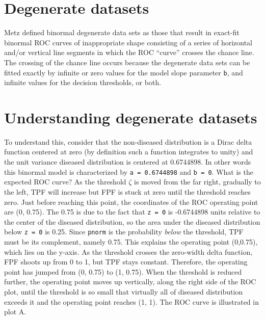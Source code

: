 \documentclass[
]{book}
\begin{document}
\hypertarget{degenerate-datasets}{%
\section{Degenerate datasets}\label{degenerate-datasets}}

Metz defined binormal degenerate data sets as those that result in exact-fit binormal ROC curves of inappropriate shape consisting of a series of horizontal and/or vertical line segments in which the ROC ``curve'' crosses the chance line. The crossing of the chance line occurs because the degenerate data sets can be fitted exactly by infinite or zero values for the model slope parameter \texttt{b}, and infinite values for the decision thresholds, or both.

\hypertarget{understanding-degenerate-datasets}{%
\section{Understanding degenerate datasets}\label{understanding-degenerate-datasets}}

To understand this, consider that the non-diseased distribution is a Dirac delta function centered at zero (by definition such a function integrates to unity) and the unit variance diseased distribution is centered at 0.6744898. In other words this binormal model is characterized by \texttt{a\ =\ 0.6744898} and \texttt{b\ =\ 0}. What is the expected ROC curve? As the threshold \(\zeta\) is moved from the far right, gradually to the left, TPF will increase but FPF is stuck at zero until the threshold reaches zero. Just before reaching this point, the coordinates of the ROC operating point are (0, 0.75). The 0.75 is due to the fact that \texttt{z\ =\ 0} is -0.6744898 units relative to the center of the diseased distribution, so the area under the diseased distribution below \texttt{z\ =\ 0} is 0.25. Since \texttt{pnorm} is the probability \emph{below} the threshold, TPF must be its complement, namely 0.75. This explains the operating point (0,0.75), which lies on the y-axis. As the threshold crosses the zero-width delta function, FPF shoots up from 0 to 1, but TPF stays constant. Therefore, the operating point has jumped from (0, 0.75) to (1, 0.75). When the threshold is reduced further, the operating point moves up vertically, along the right side of the ROC plot, until the threshold is so small that virtually all of diseased distribution exceeds it and the operating point reaches (1, 1). The ROC curve is illustrated in plot A.
\end{document}
